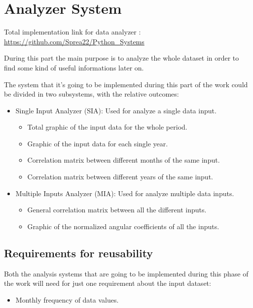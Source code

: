 
\chapter{Analyzer System}

Total implementation link for data analyzer : \\
\url{https://github.com/Sprea22/Python_Systems}

During this part the main purpose is to analyze the whole dataset in order to find some kind of useful informations later on. 

The system that it's going to be implemented during this part of the work could be divided in two subsystems, with the relative outcomes:
\begin{itemize}
\item Single Input Analyzer (SIA): Used for analyze a single data input.
\begin{itemize}
\item Total graphic of the input data for the whole period.
\item Graphic of the input data for each single year.
\item Correlation matrix between different months of the same input.
\item Correlation matrix between different years of the same input.
\end{itemize}
\item Multiple Inputs Analyzer (MIA): Used for analyze multiple data inputs.
\begin{itemize}
\item General correlation matrix between all the different inputs.

\item Graphic of the normalized angular coefficients of all the inputs.
\end{itemize}
\end{itemize}

\newpage

\section{Requirements for reusability}
Both the analysis systems that are going to be implemented during this phase of the work will need for just one requirement about the input dataset:
\begin{itemize}
\item Monthly frequency of data values.
\end{itemize}

